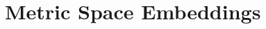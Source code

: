 \chapter{Metric Space Embeddings}
\begin{refsection}
  
  
\printbibliography[heading=subbibliography]
\end{refsection}
